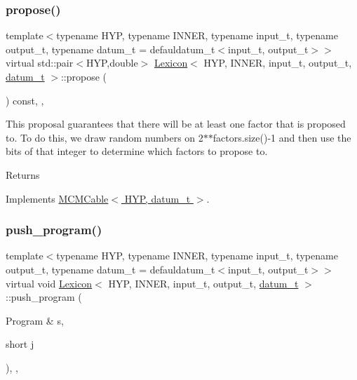 \mbox{\label{class_lexicon_afa8ea51bbd16df5f46557fe10db84980}} 
\subsubsection{\texorpdfstring{propose()}{propose()}}
{\footnotesize\ttfamily template$<$typename H\+YP, typename I\+N\+N\+ER, typename input\+\_\+t, typename output\+\_\+t, typename datum\+\_\+t = defauldatum\+\_\+t$<$input\+\_\+t, output\+\_\+t$>$$>$ \\
virtual std\+::pair$<$H\+YP,double$>$ \hyperlink{class_lexicon}{Lexicon}$<$ H\+YP, I\+N\+N\+ER, input\+\_\+t, output\+\_\+t, \hyperlink{class_bayesable_a9f1a6c0cd7855550fa10b1a8f13a5867}{datum\+\_\+t} $>$\+::propose (\begin{DoxyParamCaption}{ }\end{DoxyParamCaption}) const\hspace{0.3cm}{\ttfamily [inline]}, {\ttfamily [override]}, {\ttfamily [virtual]}}

This proposal guarantees that there will be at least one factor that is proposed to. To do this, we draw random numbers on 2$\ast$$\ast$factors.size()-\/1 and then use the bits of that integer to determine which factors to propose to. \begin{DoxyReturn}{Returns}

\end{DoxyReturn}


Implements \hyperlink{class_m_c_m_cable_ab119a14256ab92c5c1e941f8492df830}{M\+C\+M\+Cable$<$ H\+Y\+P, datum\+\_\+t $>$}.

\mbox{\label{class_lexicon_acd367c70ccc583f2a9fcbb1d007db45c}} 
\subsubsection{\texorpdfstring{push\+\_\+program()}{push\_program()}}
{\footnotesize\ttfamily template$<$typename H\+YP, typename I\+N\+N\+ER, typename input\+\_\+t, typename output\+\_\+t, typename datum\+\_\+t = defauldatum\+\_\+t$<$input\+\_\+t, output\+\_\+t$>$$>$ \\
virtual void \hyperlink{class_lexicon}{Lexicon}$<$ H\+YP, I\+N\+N\+ER, input\+\_\+t, output\+\_\+t, \hyperlink{class_bayesable_a9f1a6c0cd7855550fa10b1a8f13a5867}{datum\+\_\+t} $>$\+::push\+\_\+program (\begin{DoxyParamCaption}\item[{Program \&}]{s,  }\item[{short}]{j }\end{DoxyParamCaption})\hspace{0.3cm}{\ttfamily [inline]}, {\ttfamily [override]}, {\ttfamily [virtual]}}

